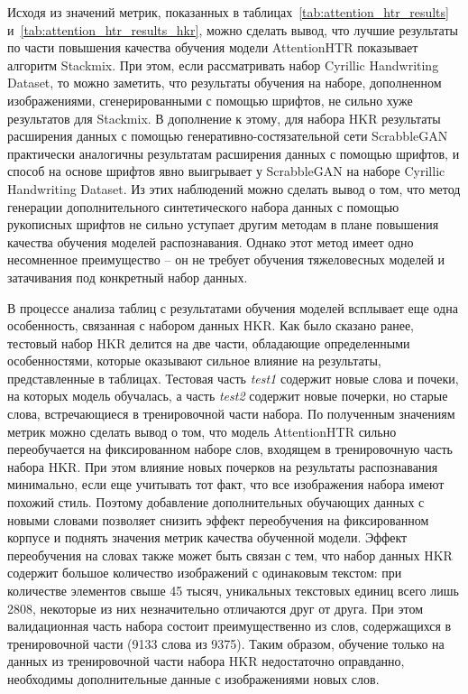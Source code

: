 Исходя из значений метрик, показанных в таблицах~\ref{tab:attention_htr_results} и~\ref{tab:attention_htr_results_hkr},
можно сделать вывод, что лучшие результаты по части повышения качества обучения модели AttentionHTR показывает алгоритм Stackmix.
При этом, если рассматривать набор Cyrillic Handwriting Dataset, то можно заметить,
что результаты обучения на наборе, дополненном изображениями, сгенерированными с помощью шрифтов, не сильно хуже результатов для Stackmix.
В дополнение к этому, для набора HKR результаты расширения данных с помощью генеративно-состязательной сети ScrabbleGAN
практически аналогичны результатам расширения данных с помощью шрифтов, и способ на основе шрифтов явно выигрывает у ScrabbleGAN
на наборе Cyrillic Handwriting Dataset.
Из этих наблюдений можно сделать вывод о том, что метод генерации дополнительного синтетического набора данных с
помощью рукописных шрифтов не сильно уступает другим методам в плане повышения качества обучения моделей распознавания.
Однако этот метод имеет одно несомненное преимущество -- он не требует обучения тяжеловесных моделей и затачивания под конкретный набор данных.

В процессе анализа таблиц с результатами обучения моделей всплывает еще одна особенность, связанная с набором данных HKR.
Как было сказано ранее, тестовый набор HKR делится на две части, обладающие определенными особенностями,
которые оказывают сильное влияние на результаты, представленные в таблицах.
Тестовая часть \textit{test1} содержит новые слова и почеки, на которых модель обучалась, а часть \textit{test2}
содержит новые почерки, но старые слова, встречающиеся в тренировочной части набора.
По полученным значениям метрик можно сделать вывод о том, что модель AttentionHTR сильно переобучается на фиксированном наборе слов,
входящем в тренировочную часть набора HKR.
При этом влияние новых почерков на результаты распознавания минимально, если еще учитывать тот факт, что все изображения набора имеют похожий стиль.
Поэтому добавление дополнительных обучающих данных с новыми словами позволяет снизить эффект переобучения на фиксированном корпусе и
поднять значения метрик качества обученной модели.
Эффект переобучения на словах также может быть связан с тем, что набор данных HKR содержит большое количество изображений с одинаковым текстом:
при количестве элементов свыше 45 тысяч, уникальных текстовых единиц всего лишь 2808, некоторые из них незначительно отличаются друг от друга.
При этом валидационная часть набора состоит преимущественно из слов, содержащихся в тренировочной части (9133 слова из 9375).
Таким образом, обучение только на данных из тренировочной части набора HKR недостаточно оправданно, необходимы дополнительные данные с изображениями новых слов.


